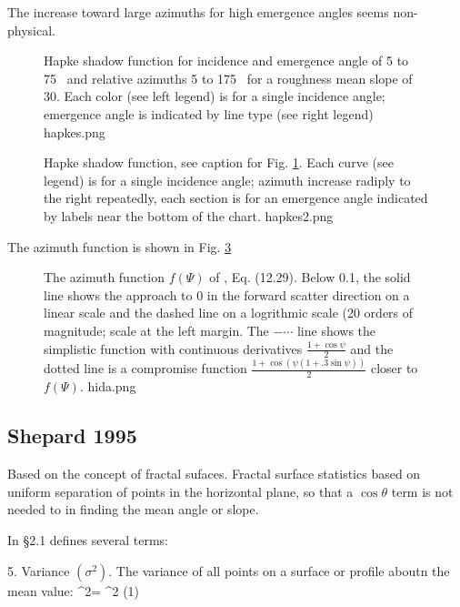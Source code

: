 \documentclass{article}
\begin{document}
The increase toward large azimuths for high emergence angles seems non-physical.

\begin{figure}[!ht] 
\caption[Hapke shadow function]{Hapke shadow function for incidence and
  emergence angle of 5 to 75\qd~ and relative azimuths 5 to 175\qd~ for a
  roughness mean slope of 30\qd. Each color (see left legend) is for a single
  incidence angle; emergence angle is indicated by line type (see right legend)
\label{hapkes}  hapkes.png  }
\end{figure} 

\begin{figure}[!ht] 
\caption[Hapke shadow function]{Hapke shadow function, see caption for
  Fig. \ref{hapkes}. Each curve (see legend) is for a single incidence angle;
  azimuth increase radiply to the right repeatedly, each section is for an
  emergence angle indicated by labels near the bottom of the chart.
\label{hapkes2}  hapkes2.png  }
\end{figure} 

The azimuth function is shown in Fig.  \ref{hida}
\begin{figure}[!ht] 
\caption[Azimuth functions]{The azimuth function $f(\Psi)$ of ,
  Eq. (12.29).  Below 0.1, the solid line shows the approach to 0 in the forward
  scatter direction on a linear scale and the dashed line on a logrithmic scale
  (20 orders of magnitude; scale at the left margin. The $-\cdots$ line shows
  the simplistic function with continuous derivatives $\frac{1+ \cos \psi}{2}$
  and the dotted line is a compromise function $\frac{1+ \cos (\psi (1+.3 \sin
    \psi)) }{2}$ closer to $f(\Psi)$. \label{hida} hida.png }
\end{figure} 

\subsection{Shepard 1995} %

Based on the concept of fractal sufaces.  
Fractal surface statistics based on uniform separation of points in the
horizontal plane, so that a $\cos \theta $ term is not needed to in finding the
mean angle or slope.

 In \S 2.1 defines several terms: \bq

5. Variance $( \sigma^2 )$. The variance of all points on a surface or profile aboutn the mean value: 
\qb \sigma^2= \langle [ z- \overline{z} ]^2 \rangle \qeq (1) \qe
\end{document}
